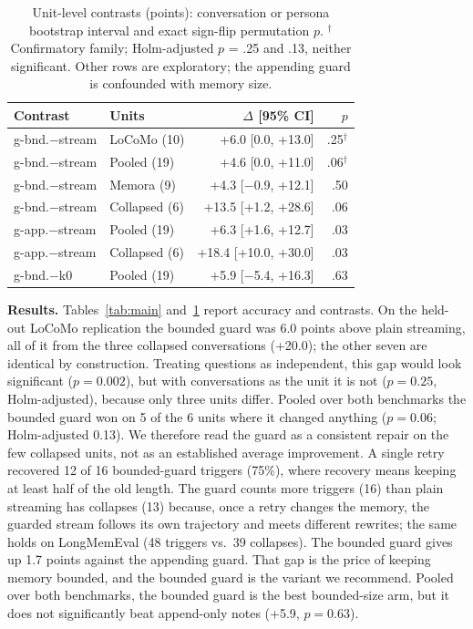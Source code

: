 \documentclass[11pt]{article}
\begin{document}
\begin{table}[t]
\centering\small
\setlength{\tabcolsep}{3pt}
\begin{tabular}{llrr}
\toprule
Contrast & Units & $\Delta$ [95\% CI] & $p$ \\
\midrule
g-bnd.$-$stream & LoCoMo (10) & +6.0 [0.0, +13.0] & .25$^\dagger$ \\
g-bnd.$-$stream & Pooled (19) & +4.6 [0.0, +11.0] & .06$^\dagger$ \\
g-bnd.$-$stream & Memora (9) & +4.3 [$-$0.9, +12.1] & .50 \\
g-bnd.$-$stream & Collapsed (6) & +13.5 [+1.2, +28.6] & .06 \\
g-app.$-$stream & Pooled (19) & +6.3 [+1.6, +12.7] & .03 \\
g-app.$-$stream & Collapsed (6) & +18.4 [+10.0, +30.0] & .03 \\
g-bnd.$-$k0 & Pooled (19) & +5.9 [$-$5.4, +16.3] & .63 \\
\bottomrule
\end{tabular}
\caption{Unit-level contrasts (points): conversation or persona bootstrap interval and exact sign-flip permutation $p$. $^\dagger$Confirmatory family; Holm-adjusted $p$ = .25 and .13, neither significant. Other rows are exploratory; the appending guard is confounded with memory size.}
\label{tab:contrast}
\end{table}

\textbf{Results.} Tables~\ref{tab:main} and~\ref{tab:contrast} report accuracy and contrasts. On the held-out LoCoMo replication the bounded guard was 6.0 points above plain streaming, all of it from the three collapsed conversations (+20.0); the other seven are identical by construction. Treating questions as independent, this gap would look significant ($p{=}0.002$), but with conversations as the unit it is not ($p{=}0.25$, Holm-adjusted), because only three units differ. Pooled over both benchmarks the bounded guard won on 5 of the 6 units where it changed anything ($p{=}0.06$; Holm-adjusted 0.13). We therefore read the guard as a consistent repair on the few collapsed units, not as an established average improvement. A single retry recovered 12 of 16 bounded-guard triggers (75\%), where recovery means keeping at least half of the old length. The guard counts more triggers (16) than plain streaming has collapses (13) because, once a retry changes the memory, the guarded stream follows its own trajectory and meets different rewrites; the same holds on LongMemEval (48 triggers vs.\ 39 collapses). The bounded guard gives up 1.7 points against the appending guard. That gap is the price of keeping memory bounded, and the bounded guard is the variant we recommend. Pooled over both benchmarks, the bounded guard is the best bounded-size arm, but it does not significantly beat append-only notes (+5.9, $p{=}0.63$).
\end{document}
